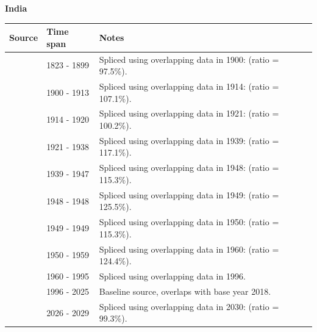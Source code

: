 \documentclass[12pt,a4paper,landscape]{article}
\begin{document}
\begin{adjustbox}{max totalsize={\paperwidth}{\paperheight},center}
\begin{minipage}[t][\textheight][t]{\textwidth}
\vspace*{0.5cm}
{}
\begin{center}
{\Large\bfseries India}
\end{center}
\vspace{0.5cm}
\begin{table}[H]
\centering
\small
\begin{tabular}{|l|l|l|}
\hline
\textbf{Source} & \textbf{Time span} & \textbf{Notes} \\
\hline
\rowcolor{white}\cite{Tena}& 1823 - 1899 &Spliced using overlapping data in 1900: (ratio = 97.5\%).\\
\rowcolor{lightgray}\cite{UN_trade}& 1900 - 1913 &Spliced using overlapping data in 1914: (ratio = 107.1\%).\\
\rowcolor{white}\cite{Tena}& 1914 - 1920 &Spliced using overlapping data in 1921: (ratio = 100.2\%).\\
\rowcolor{lightgray}\cite{UN_trade}& 1921 - 1938 &Spliced using overlapping data in 1939: (ratio = 117.1\%).\\
\rowcolor{white}\cite{Mitchell}& 1939 - 1947 &Spliced using overlapping data in 1948: (ratio = 115.3\%).\\
\rowcolor{lightgray}\cite{UN_trade}& 1948 - 1948 &Spliced using overlapping data in 1949: (ratio = 125.5\%).\\
\rowcolor{white}\cite{Mitchell}& 1949 - 1949 &Spliced using overlapping data in 1950: (ratio = 115.3\%).\\
\rowcolor{lightgray}\cite{UN_trade}& 1950 - 1959 &Spliced using overlapping data in 1960: (ratio = 124.4\%).\\
\rowcolor{white}\cite{WDI}& 1960 - 1995 &Spliced using overlapping data in 1996.\\
\rowcolor{lightgray}\cite{OECD_EO}& 1996 - 2025 &Baseline source, overlaps with base year 2018.\\
\rowcolor{white}\cite{IMF_WEO_forecast}& 2026 - 2029 &Spliced using overlapping data in 2030: (ratio = 99.3\%).\\
\hline
\end{tabular}
\end{table}
\begin{figure}[H]
\centering

\end{figure}
\end{minipage}
\end{adjustbox}
\end{document}
